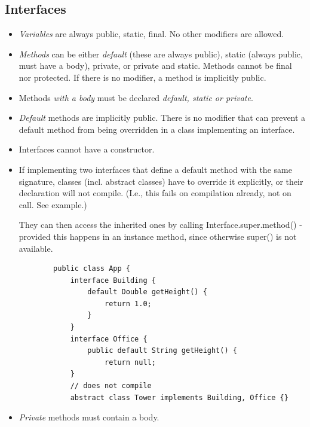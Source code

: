 \documentclass{scrartcl}
\begin{document}
\subsection{Interfaces}
\begin{itemize}

    \item     \textit{Variables} are always public, static, final. No other modifiers are allowed.

    \item     \textit{Methods} can be either \textit{default} (these are always public), static (always public, must have a body), private, or private and static. Methods cannot be final nor protected. If there is no modifier, a method is implicitly public.

    \item Methods \textit{with a body} must be declared \textit{default, static or private}.

    \item     \textit{Default} methods are implicitly public. There is no modifier that can prevent a default method from being overridden in a class implementing an interface.

    \item Interfaces cannot have a constructor.

    \item     If implementing two interfaces that define a default method with the same signature, classes (incl. abstract classes) have to override it explicitly, or their declaration will not compile. (I.e., this fails on compilation already, not on call. See example.)

    They can then access the inherited ones by calling Interface.super.method() - provided this happens in an instance method, since otherwise super() is not available.

    \begin{lstlisting}
        public class App {
            interface Building {
                default Double getHeight() {
                    return 1.0;
                }
            }
            interface Office {
                public default String getHeight() {
                    return null;
            }
            // does not compile
            abstract class Tower implements Building, Office {}

    \end{lstlisting}

    \item     \textit{Private} methods must contain a body.


\end{itemize}
\end{document}
